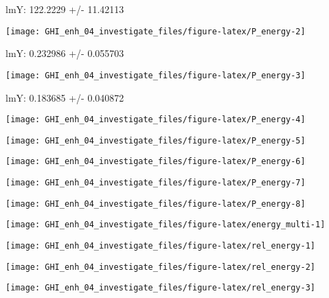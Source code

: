 \documentclass[
  10pt,
  a4paper,oneside]{article}
\begin{document}
lmY: 122.2229 +/- 11.42113

\begin{center}\texttt{[image: GHI\_enh\_04\_investigate\_files/figure-latex/P\_energy-2]} \end{center}

lmY: 0.232986 +/- 0.055703

\begin{center}\texttt{[image: GHI\_enh\_04\_investigate\_files/figure-latex/P\_energy-3]} \end{center}

lmY: 0.183685 +/- 0.040872

\begin{center}\texttt{[image: GHI\_enh\_04\_investigate\_files/figure-latex/P\_energy-4]} \end{center}

\begin{center}\texttt{[image: GHI\_enh\_04\_investigate\_files/figure-latex/P\_energy-5]} \end{center}

\begin{center}\texttt{[image: GHI\_enh\_04\_investigate\_files/figure-latex/P\_energy-6]} \end{center}

\begin{center}\texttt{[image: GHI\_enh\_04\_investigate\_files/figure-latex/P\_energy-7]} \end{center}

\begin{center}\texttt{[image: GHI\_enh\_04\_investigate\_files/figure-latex/P\_energy-8]} \end{center}

\begin{center}\texttt{[image: GHI\_enh\_04\_investigate\_files/figure-latex/energy\_multi-1]} \end{center}

\begin{center}\texttt{[image: GHI\_enh\_04\_investigate\_files/figure-latex/rel\_energy-1]} \end{center}

\begin{center}\texttt{[image: GHI\_enh\_04\_investigate\_files/figure-latex/rel\_energy-2]} \end{center}

\begin{center}\texttt{[image: GHI\_enh\_04\_investigate\_files/figure-latex/rel\_energy-3]} \end{center}
\end{document}
